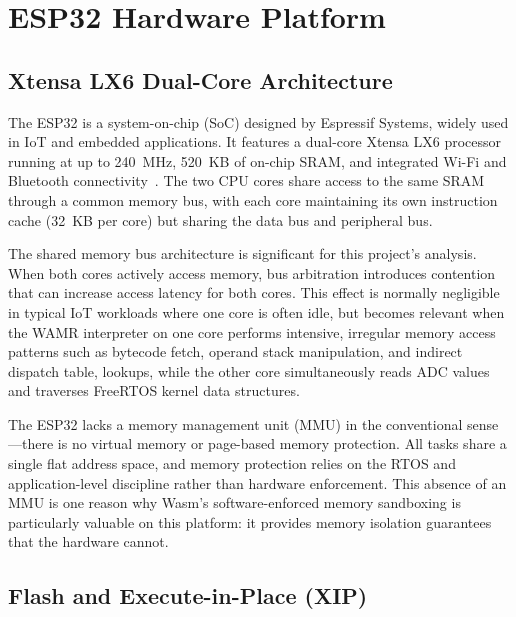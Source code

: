 \documentclass[12pt, a4paper]{report}
\begin{document}
\section{ESP32 Hardware Platform}
\label{sec:esp32}

\subsection{Xtensa LX6 Dual-Core Architecture}
\label{subsec:xtensa}

The ESP32 is a system-on-chip (SoC) designed by Espressif Systems, widely used in IoT and embedded applications. It features a dual-core Xtensa LX6 processor running at up to 240~MHz, 520~KB of on-chip SRAM, and integrated Wi-Fi and Bluetooth connectivity~\cite{esp32-trm}. The two CPU cores share access to the same SRAM through a common memory bus, with each core maintaining its own instruction cache (32~KB per core) but sharing the data bus and peripheral bus.

The shared memory bus architecture is significant for this project's analysis. When both cores actively access memory, bus arbitration introduces contention that can increase access latency for both cores. This effect is normally negligible in typical IoT workloads where one core is often idle, but becomes relevant when the WAMR interpreter on one core performs intensive, irregular memory access patterns such as bytecode fetch, operand stack manipulation, and indirect dispatch table, lookups, while the other core simultaneously reads ADC values and traverses FreeRTOS kernel data structures.

The ESP32 lacks a memory management unit (MMU) in the conventional sense---there is no virtual memory or page-based memory protection. All tasks share a single flat address space, and memory protection relies on the RTOS and application-level discipline rather than hardware enforcement. This absence of an MMU is one reason why Wasm's software-enforced memory sandboxing is particularly valuable on this platform: it provides memory isolation guarantees that the hardware cannot.



\subsection{Flash and Execute-in-Place (XIP)}
\label{subsec:esp32-xip}
\end{document}

